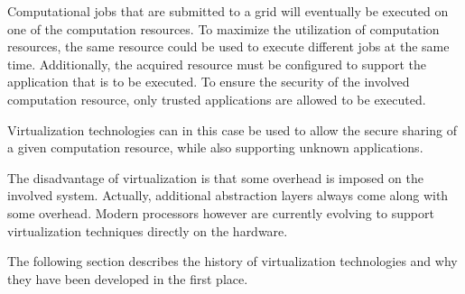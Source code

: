 Computational  jobs  that are  submitted  to  a  grid will  eventually  be
executed on one of the  computation resources. To maximize the utilization
of  computation resources,  the same  resource  could be  used to  execute
different jobs at the same  time. Additionally, the acquired resource must
be configured to support the application that is to be executed. To ensure
the  security   of  the   involved  computation  resource,   only  trusted
applications are allowed to be executed.

Virtualization technologies can  in this case be used  to allow the secure
sharing  of a given  computation resource,  while also  supporting unknown
applications.

The disadvantage of virtualization is that some overhead is imposed on the
involved system. Actually, additional abstraction layers always come along
with some  overhead. Modern processors  however are currently  evolving to
support virtualization techniques directly on the hardware.

The following section describes the history of virtualization technologies
and why they have been developed in the first place.


  

